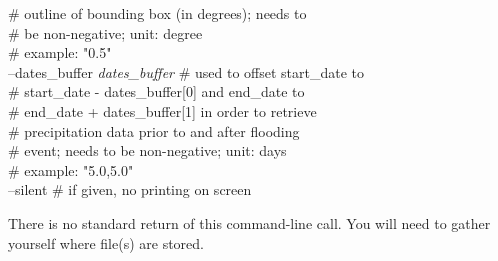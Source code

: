 \documentclass[10pt,a4paper,titlepage,parskip]{scrartcl}
\newenvironment{ttfont}{\fontfamily{\ttdefault}\selectfont}{\par}
\newcommand{\GRAU}[1]{\textcolor{ufzgray2}{#1}}
\begin{document}
\begin{framed}
\begin{ttfont}
\begin{tabbing}
			\> \> \GRAU{\# outline of bounding box (in degrees); needs to}\\
			\> \> \GRAU{\# be non-negative; unit: degree}\\
			\> \> \GRAU{\# example: "0.5"}\\
			\> --dates\_buffer \textit{dates\_buffer} \> \GRAU{\# used to offset start\_date to}\\
			\> \> \GRAU{\# start\_date - dates\_buffer[0] and end\_date to }\\
			\> \> \GRAU{\# end\_date + dates\_buffer[1] in order to retrieve}\\
			\> \> \GRAU{\# precipitation data prior to and after flooding}\\
			\> \> \GRAU{\# event; needs to be non-negative; unit: days}\\
			\> \> \GRAU{\# example: "5.0,5.0"}\\
			\> --silent \> \GRAU{\# if given, no printing on screen}\\
		\end{tabbing}
	\end{ttfont}
	\vspace*{-0.3cm}
\end{framed}
\vspace*{-0.3cm}
There is no standard return of this command-line call. You will need to gather yourself where file(s) are stored.
\pagebreak
\end{document}
